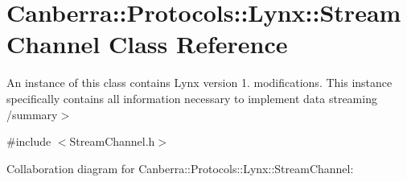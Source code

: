 \hypertarget{class_canberra_1_1_protocols_1_1_lynx_1_1_stream_channel}{}\section{Canberra\+:\+:Protocols\+:\+:Lynx\+:\+:Stream\+Channel Class Reference}
\label{class_canberra_1_1_protocols_1_1_lynx_1_1_stream_channel}


An instance of this class contains Lynx version 1. modifications. This instance specifically contains all information necessary to implement data streaming /summary$>$  




{\ttfamily \#include $<$Stream\+Channel.\+h$>$}



Collaboration diagram for Canberra\+:\+:Protocols\+:\+:Lynx\+:\+:Stream\+Channel\+:
